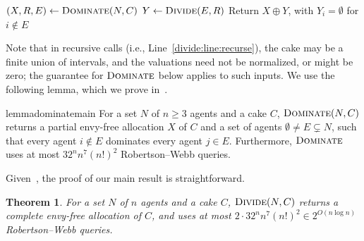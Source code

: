 \documentclass[11pt]{article}
\newcommand{\Dominate}{\textsc{Dominate}}
\newcommand{\Divide}{\textsc{Divide}}
\theoremstyle{plain}
\newtheorem{theorem}{Theorem}
\theoremstyle{definition}
\theoremstyle{plain}
\begin{document}
\begin{algorithm}[H]
\caption{$\Divide(N,C)$}\label{algo:divide}
$(X,R,E) \gets \Dominate(N,C)$\;\label{divide:line:dominate call}
$Y \gets \Divide(E,R)$\; \label{divide:line:recurse}
Return $X\oplus Y$, with $Y_i=\emptyset$ for $i\notin E$\;
\end{algorithm}

Note that in recursive calls (i.e., Line~\ref{divide:line:recurse}), the cake may be a finite union of intervals, and the valuations need not be normalized, or might be zero; the guarantee for $\Dominate$ below applies to such inputs. We use the following lemma, which we prove in~.

\begin{restatable}{lemma}{dominatemain}\label{lem: dominate}
    For a set $N$ of $n \geq 3$ agents and a cake $C$, $\Dominate(N,C)$ returns a partial envy-free allocation $X$ of $C$ and a set of agents $\emptyset \ne E \subsetneq N$, such that every agent $i \notin E$ dominates every agent $j \in E$. Furthermore, $\Dominate{}$ uses at most $32^n n^7(n!)^2$ Robertson--Webb queries.
\end{restatable}

Given~, the proof of our main result is straightforward.

\begin{theorem}\label{thm: main theorem}
   For a set $N$ of $n$ agents and a cake $C$, $\Divide(N,C)$ returns a complete envy-free allocation of $C$, and uses at most $2\cdot32^n n^7(n!)^2 \in 2^{O(n \log n)}$ Robertson--Webb queries.
\end{theorem}
\end{document}
